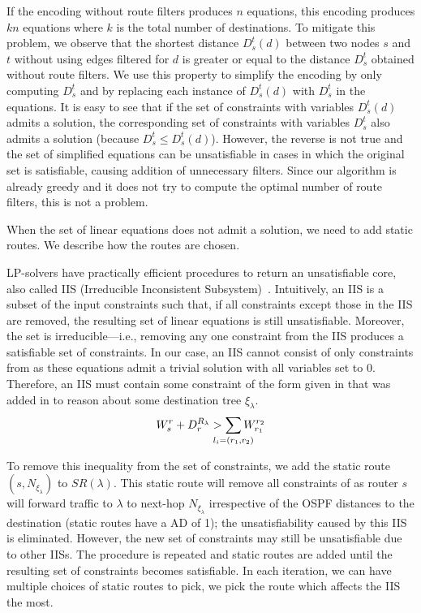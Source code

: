 If the encoding without route filters produces $n$ equations, this
encoding produces $kn$ equations where $k$ is the total number of destinations.  
To mitigate this problem, we observe that the shortest distance $D_s^t(d)$ between two
nodes $s$ and $t$ without using edges filtered for $d$ is
greater or equal to the distance $D_s^t$ obtained without route filters.  
We use this property to simplify the
encoding by only computing $D_s^t$ and by replacing each instance of
$D_s^t(d)$ with $D_s^t$ in the equations.  It is easy to see that 
if the set of constraints with variables $D_s^t(d)$ admits a solution,
the corresponding set of constraints with variables $D_s^t$ 
also admits a solution (because $D_s^t\leq
D_s^t(d)$).  However, the reverse is not true and the set of
simplified equations can be unsatisfiable in cases in which the
original set is satisfiable, causing addition of unnecessary filters.
Since our algorithm is already greedy and it does not try to compute the optimal 
number of route filters, this is not a problem.


When the set of linear equations does not admit a solution, we 
need to add static routes. We describe how the routes are chosen.

LP-solvers have practically efficient procedures to return an
unsatisfiable core, also called IIS (Irreducible Inconsistent Subsystem)~\cite{chinneck2007feasibility}. 
Intuitively, an IIS is a subset of the input constraints such that,
if all constraints except those in the IIS are removed, the resulting set of
linear equations is still unsatisfiable. Moreover, the set is irreducible---i.e., removing 
any one constraint from the IIS produces a satisfiable set of constraints. 
In our case, an IIS cannot consist of only 
constraints from  as these equations
admit a trivial solution with all variables set to 0. 
Therefore, an IIS must contain some constraint of the form
given in  
that was added in to reason about some destination tree $\xi_\lambda$.
\[
W_s^r + D_r^{R_\lambda}  > \sum_{\mathclap{\substack{l_i=(r_1,r_2)}}} 
		W_{r_1}^{r_2}
\]		


To remove this inequality from the set of constraints, we add the static route $(s,N_{\xi_\lambda})$ to $SR(\lambda)$.
This static route will remove all constraints of  as router $s$ 
will forward traffic to $\lambda$ to next-hop $N_{\xi_\lambda}$ irrespective of
the OSPF distances to the destination (static routes have a AD of 1); the 
unsatisfiability caused by this IIS is eliminated. However, the new set of
constraints may still be unsatisfiable due to other IISs.
The procedure is repeated and static routes are added until the resulting set of
constraints becomes satisfiable. In each iteration, we can have multiple 
choices of static routes to pick, we pick the route which affects the IIS the most. 




